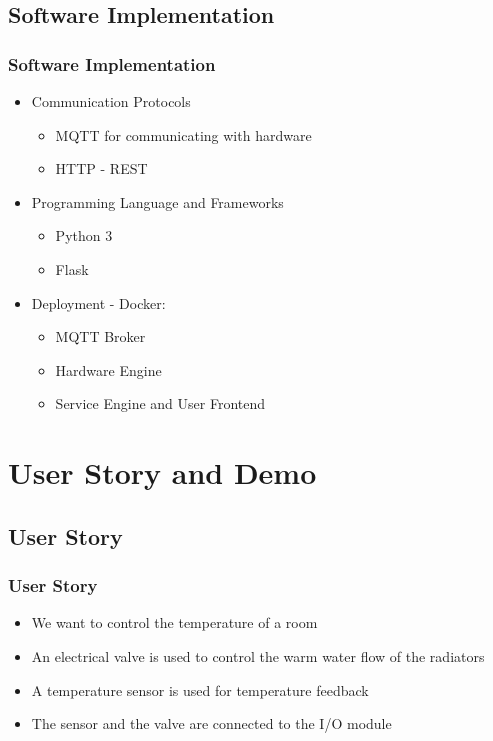 \documentclass[aspectratio=169]{beamer}
\begin{document}
\subsection{Software Implementation}
\begin{frame}
\frametitle{Software Implementation}
\begin{itemize}
\item Communication Protocols
\begin{itemize}
\item MQTT for communicating with hardware
\item HTTP - REST
\end{itemize}
\item Programming Language and Frameworks
\begin{itemize}
\item Python 3
\item Flask 
\end{itemize}
\item Deployment - Docker:
\begin{itemize}
\item MQTT Broker
\item Hardware Engine
\item Service Engine and User Frontend
\end{itemize}

\end{itemize}
\end{frame}



\section{User Story and Demo}
\subsection{User Story}
\begin{frame}
\frametitle{User Story}
\begin{itemize}
\item We want to control the temperature of a room
\item An electrical valve is used to control the warm water flow of the radiators
\item A temperature sensor is used for temperature feedback
\item The sensor and the valve are connected to the I/O module
\end{itemize}
\end{frame}
\end{document}
